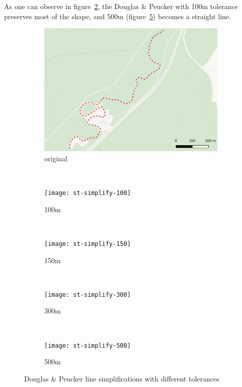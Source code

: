 \documentclass{article}
\begin{document}
As one can observe in figure~\ref{fig:douglas-100}, the Douglas \& Peucker with
100m tolerance preserves most of the shape, and 500m
(figure~\ref{fig:douglas-500}) becomes a straight line.

\begin{figure}
    \centering
    \begin{subfigure}[b]{0.18\textwidth}
        \includegraphics[width=\textwidth]{zeimena}
        \caption{original}
        \label{fig:zeimena-original}
    \end{subfigure}
    ~
    \begin{subfigure}[b]{0.18\textwidth}
        \texttt{[image: st-simplify-100]}
        \caption{100m}
        \label{fig:douglas-100}
    \end{subfigure}
    ~
    \begin{subfigure}[b]{0.18\textwidth}
        \texttt{[image: st-simplify-150]}
        \caption{150m}
        \label{fig:douglas-150}
    \end{subfigure}
    ~
    \begin{subfigure}[b]{0.18\textwidth}
        \texttt{[image: st-simplify-300]}
        \caption{300m}
        \label{fig:douglas-300}
    \end{subfigure}
    ~
    \begin{subfigure}[b]{0.18\textwidth}
        \texttt{[image: st-simplify-500]}
        \caption{500m}
        \label{fig:douglas-500}
    \end{subfigure}
    \caption{Douglas \& Peucker line simplifications with different tolerances}
    \label{fig:douglas-peucker}
\end{figure}
\end{document}

